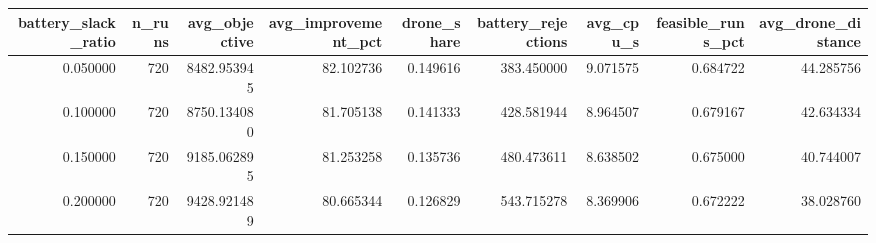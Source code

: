 \begin{tabular}{rrrrrrrrr}
\toprule
battery_slack_ratio & n_runs & avg_objective & avg_improvement_pct & drone_share & battery_rejections & avg_cpu_s & feasible_runs_pct & avg_drone_distance \\
\midrule
0.050000 & 720 & 8482.953945 & 82.102736 & 0.149616 & 383.450000 & 9.071575 & 0.684722 & 44.285756 \\
0.100000 & 720 & 8750.134080 & 81.705138 & 0.141333 & 428.581944 & 8.964507 & 0.679167 & 42.634334 \\
0.150000 & 720 & 9185.062895 & 81.253258 & 0.135736 & 480.473611 & 8.638502 & 0.675000 & 40.744007 \\
0.200000 & 720 & 9428.921489 & 80.665344 & 0.126829 & 543.715278 & 8.369906 & 0.672222 & 38.028760 \\
\bottomrule
\end{tabular}
